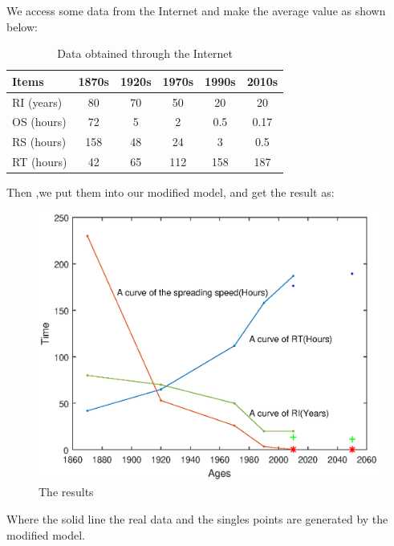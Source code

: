 	\par We access some data from the Internet and make the average value as shown below:
\begin{table}[tbp]
	 \centering%
	\begin{tabular}{lccccc}  %
		\hline
		Items & 1870s & 1920s & 1970s & 1990s & 2010s\\ \hline  %
		RI (years) & 80 & 70  & 50  & 20 & 20 \\         %
		OS (hours)& 72 & 5 & 2 & 0.5 & 0.17\\        %
		RS (hours) & 158 & 48 & 24 & 3 & 0.5\\ 
		RT (hours) & 42 & 65 & 112 & 158 & 187  \\
		\hline
	\end{tabular}
	\caption{Data obtained through the Internet}\label{tab:1}
\end{table} 
\par Then ,we put them into our modified model, and get the result as:
\begin{figure}[h]
	\small
	\centering
	\includegraphics[width=15cm]{./picture/wtf.eps}
	\caption{The results}
	\label{fig:The results}
\end{figure}

\par Where the solid line the real data and the singles points are generated by the modified model.

